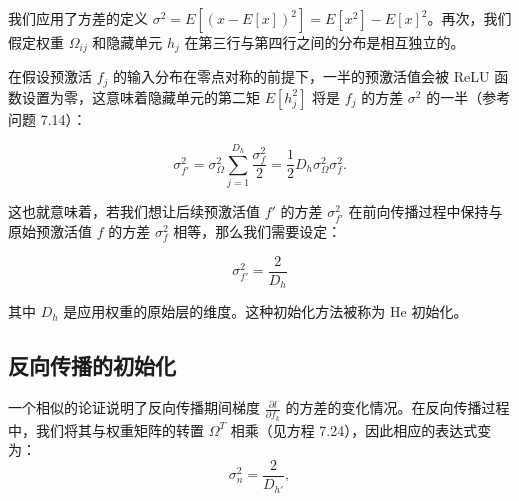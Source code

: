 \documentclass[lang=cn,newtx,10pt,scheme=chinese]{elegantbook}
\begin{document}
我们应用了方差的定义 \(\sigma^2 = E[(x - E[x])^2] = E[x^2] - E[x]^2\)。再次，我们假定权重 \(\Omega_{ij}\) 和隐藏单元 \(h_j\) 在第三行与第四行之间的分布是相互独立的。

在假设预激活 \(f_j\) 的输入分布在零点对称的前提下，一半的预激活值会被 ReLU 函数设置为零，这意味着隐藏单元的第二矩 \(E[h_j^2]\) 将是 \(f_j\) 的方差 \(\sigma^2\) 的一半（参考问题 7.14）：


\begin{equation}
\sigma_{f'}^2 = \sigma_\Omega^2 \sum_{j=1}^{D_h} \frac{\sigma_f^2}{2} = \frac{1}{2} D_h\sigma_\Omega^2\sigma_f^2. 
\end{equation}

这也就意味着，若我们想让后续预激活值 \(f'\) 的方差 \(\sigma_{f'}^2\) 在前向传播过程中保持与原始预激活值 \(f\) 的方差 \(\sigma_f^2\) 相等，那么我们需要设定：


\begin{equation}
\sigma_{f'}^2 = \frac{2}{D_h} 
\end{equation}

其中 \(D_h\) 是应用权重的原始层的维度。这种初始化方法被称为 He 初始化。


\subsection{反向传播的初始化}
一个相似的论证说明了反向传播期间梯度 \(\frac{\partial l}{\partial f_k}\) 的方差的变化情况。在反向传播过程中，我们将其与权重矩阵的转置 \(\Omega^T\) 相乘（见方程 7.24），因此相应的表达式变为：
\begin{equation}
\sigma^2_n = \frac{2}{D_{h'}}, 
\end{equation}
\end{document}

